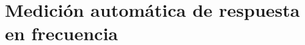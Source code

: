 \documentclass[../../tc_tp3_main.tex]{subfiles}
\begin{document}
\chapter{Medici\'on autom\'atica de respuesta en frecuencia}
\end{document}
